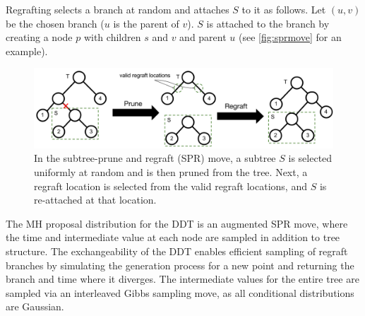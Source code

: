 Regrafting selects a branch at random
and attaches $S$ to it as follows. 
Let $(u, v)$ be the chosen branch ($u$ is the parent of $v$).
$S$ is attached to the branch by creating a node
$p$ with children $s$ and $v$ and parent $u$ 
(see \autoref{fig:sprmove} for an example).

\begin{figure}[htp!]
    \centering
    \includegraphics[width=\textwidth]{img/ibhc/SPRMove}
    \caption{In the subtree-prune and regraft (SPR) move, a subtree $S$
        is selected uniformly at random and is then pruned from the tree. 
            Next, a regraft location is selected from the valid regraft locations, and $S$ is re-attached
            at that location.}
    \label{fig:sprmove}
\end{figure}

The MH proposal distribution for the DDT
is an augmented SPR move, where
the time and intermediate value at each
node are sampled in addition to tree structure.
The exchangeability of the DDT enables
efficient sampling of regraft branches by 
simulating the generation process for a new point
and returning the branch and time where it diverges.
The intermediate values for the entire
tree are sampled via an interleaved Gibbs sampling move,
as all conditional distributions are Gaussian.
